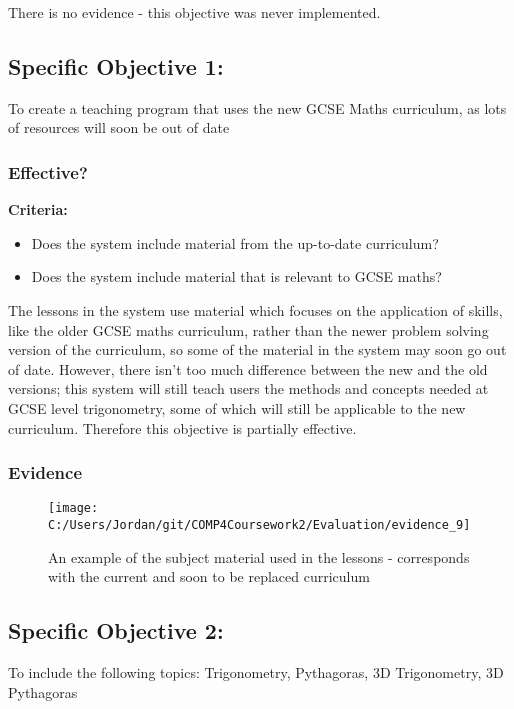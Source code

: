 There is no evidence - this objective was never implemented.

\subsection{Specific Objective 1: }

To create a teaching program that uses the new GCSE Maths curriculum, as lots of resources will soon be out of date

\subsubsection{Effective?}

\textbf{Criteria: }

\begin{itemize}
	\item Does the system include material from the up-to-date curriculum?
	\item Does the system include material that is relevant to GCSE maths?
\end{itemize}

The lessons in the system use material which focuses on the application of skills, like the older GCSE maths curriculum, rather than the newer problem solving version of the curriculum, so some of the material in the system may soon go out of date. However, there isn't too much difference between the new and the old versions; this system will still teach users the methods and concepts needed at GCSE level trigonometry, some of which will still be applicable to the new curriculum. Therefore this objective is partially effective.

\subsubsection{Evidence}

\begin{figure}[H]
	\texttt{[image: C:/Users/Jordan/git/COMP4Coursework2/Evaluation/evidence\_9]}
	\caption{An example of the subject material used in the lessons - corresponds with the current and soon to be replaced curriculum}
\end{figure}

\subsection{Specific Objective 2: }

To include the following topics: Trigonometry, Pythagoras, 3D Trigonometry, 3D Pythagoras

